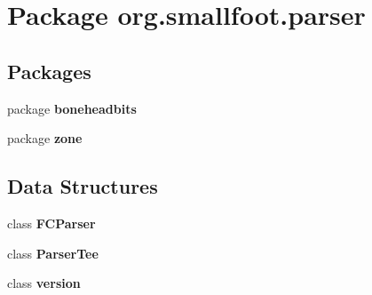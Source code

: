 \section{Package org.\+smallfoot.\+parser}
\label{namespaceorg_1_1smallfoot_1_1parser}
\subsection*{Packages}
\begin{DoxyCompactItemize}
\item 
package {\bf boneheadbits}
\item 
package {\bf zone}
\end{DoxyCompactItemize}
\subsection*{Data Structures}
\begin{DoxyCompactItemize}
\item 
class {\bf F\+C\+Parser}
\item 
class {\bf Parser\+Tee}
\item 
class {\bf version}
\end{DoxyCompactItemize}

